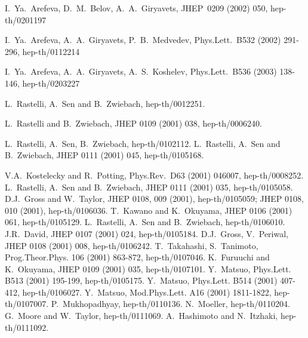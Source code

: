 \documentclass[a4paper,12pt]{article}
\begin{document}
{\small
\begin{thebibliography}{99}

I.~Ya.~Arefeva, D.~M.~Belov, A.~A.~Giryavets, JHEP~0209 (2002) 050,
hep-th/0201197

I.~Ya.~Arefeva, A.~A.~Giryavets, P.~B.~Medvedev,
Phys.Lett.~B532 (2002) 291-296, hep-th/0112214

I.~Ya.~Arefeva, A.~A.~Giryavets, A.~S.~Koshelev,
Phys.Lett.~B536 (2003) 138-146, hep-th/0203227

 L.~Rastelli, A.~Sen and B.~Zwiebach,
hep-th/0012251.



 L.~Rastelli and B.~Zwiebach,
JHEP
0109 (2001) 038, hep-th/0006240.

 L.~Rastelli, A.~Sen, B.~Zwiebach,
hep-th/0102112.
L.~Rastelli, A.~Sen and B.~Zwiebach,
JHEP 0111 (2001) 045, hep-th/0105168.

V.A.~Kostelecky and R.~Potting,
Phys.Rev.~D63 (2001) 046007, hep-th/0008252.
L.~Rastelli, A.~Sen and B.~Zwiebach,
 JHEP 0111 (2001) 035, hep-th/0105058.
D.J.~Gross and W.~Taylor,
 JHEP 0108, 009 (2001),
hep-th/0105059;
 JHEP 0108, 010 (2001),
hep-th/0106036.
T.~Kawano and K.~Okuyama, 
JHEP 0106 (2001) 061, hep-th/0105129.
L.~Rastelli, A.~Sen and B.~Zwiebach,
 hep-th/0106010.
J.R.~David, JHEP 0107 (2001) 024, hep-th/0105184.
D.J.~Gross, V.~Periwal,
 JHEP 0108 (2001) 008, hep-th/0106242.
T.~Takahashi, S.~Tanimoto,
 Prog.Theor.Phys. 106 (2001) 863-872, hep-th/0107046.
K.~Furuuchi and K.~Okuyama,  JHEP 0109 (2001) 035, hep-th/0107101.
Y.~Matsuo,
 Phys.Lett. B513 (2001) 195-199,
hep-th/0105175.
Y.~Matsuo, Phys.Lett. B514 (2001) 407-412,
hep-th/0106027.
Y.~Matsuo,  Mod.Phys.Lett. A16
(2001) 1811-1822, hep-th/0107007.
P.~Mukhopadhyay,
 hep-th/0110136.
N.~Moeller,
 hep-th/0110204.
G.~Moore and W.~Taylor,
 hep-th/0111069.
A.~Hashimoto and N.~Itzhaki,
 hep-th/0111092.



\end{thebibliography}}
\end{document}
